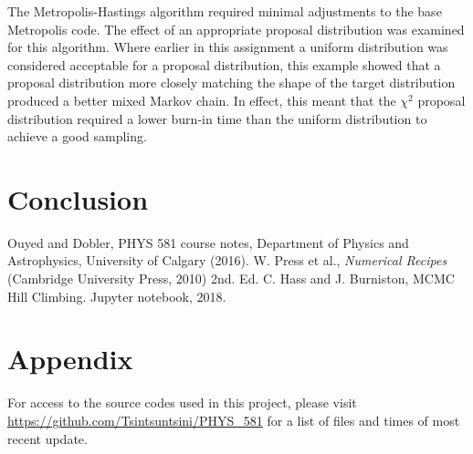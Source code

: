 \documentclass[twocolumn]{article}
\begin{document}
The Metropolis-Hastings algorithm required minimal adjustments to the base Metropolis code. The effect of an appropriate proposal distribution was examined for this algorithm. Where earlier in this assignment a uniform distribution was considered acceptable for a proposal distribution, this example showed that a proposal distribution more closely matching the shape of the target distribution produced a better mixed Markov chain. In effect, this meant that the $\chi^2$ proposal distribution required a lower burn-in time than the uniform distribution to achieve a good sampling. 
 
\section{Conclusion}



\begin{thebibliography}{00}
	Ouyed and Dobler, PHYS 581 course notes, Department of Physics and Astrophysics, University of Calgary (2016).
	W. Press et al., \emph{Numerical Recipes} (Cambridge University Press, 2010) 2nd. Ed.
	C. Hass and J. Burniston, MCMC Hill Climbing. Jupyter notebook, 2018.
\end{thebibliography}

\section{Appendix}
For access to the source codes used in this project, please visit \url{https://github.com/Tsintsuntsini/PHYS_581} for a list of files and times of most recent update.
	
\end{document}
